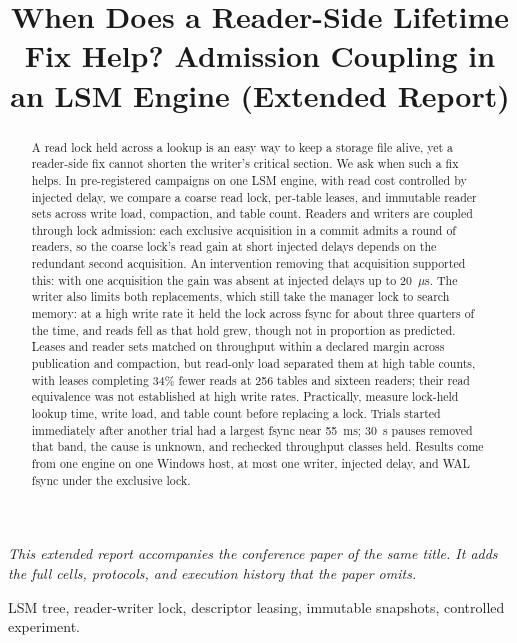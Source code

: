 \documentclass[conference]{IEEEtran}
\begin{document}
\raggedbottom
\title{When Does a Reader-Side Lifetime Fix Help? Admission Coupling in an LSM Engine (Extended Report)}
\author{
}
\maketitle
\noindent\textit{This extended report accompanies the conference paper of the same title. It adds the full cells, protocols, and execution history that the paper omits.}

\begin{abstract}
A read lock held across a lookup is an easy way to keep a storage file alive, yet a reader-side fix cannot shorten the writer's critical section. We ask when such a fix helps. In \FollowCampaignWord{} pre-registered campaigns on one LSM engine, with read cost controlled by injected delay, we compare a coarse read lock, per-table leases, and immutable reader sets across write load, compaction, and table count. Readers and writers are coupled through lock admission: each exclusive acquisition in a commit admits a round of readers, so the coarse lock's read gain at short injected delays depends on the redundant second acquisition. An intervention removing that acquisition supported this: with one acquisition the gain was absent at injected delays up to 20~$\mu$s. The writer also limits both replacements, which still take the manager lock to search memory: at a high write rate it held the lock across fsync for about three quarters of the time, and reads fell as that hold grew, though not in proportion as predicted. Leases and reader sets matched on throughput within a declared margin across publication and compaction, but read-only load separated them at high table counts, with leases completing 34\% fewer reads at 256 tables and sixteen readers; their read equivalence was not established at high write rates. Practically, measure lock-held lookup time, write load, and table count before replacing a lock. Trials started immediately after another trial had a largest fsync near 55~ms; 30~s pauses removed that band, the cause is unknown, and rechecked throughput classes held. Results come from one engine on one Windows host, at most one writer, injected delay, and WAL fsync under the exclusive lock.
\end{abstract}
\begin{IEEEkeywords}
LSM tree, reader-writer lock, descriptor leasing, immutable snapshots, controlled experiment.
\end{IEEEkeywords}
\end{document}
